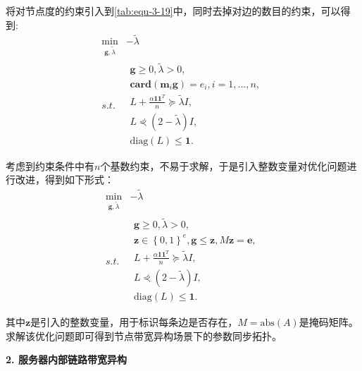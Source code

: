 将对节点度的约束引入到\autoref{tab:equ-3-19}中，同时去掉对边的数目的约束，可以得到:
\begin{equation}
    \label{tab:equ-3-24}
    \begin{matrix}
        \underset{\mathbf{g},\tilde{\lambda}}{\min}&		-\tilde{\lambda}\\
        s.t.&		\begin{array}{c}
        \mathbf{g}\ge 0,\tilde{\lambda}>0,\\
        \mathbf{card}\left( \boldsymbol{m}_i\mathbf{g} \right) =e_i, i=1,...,n,\\
        L+\frac{\alpha \mathbf{1}\mathbf{1}^T}{n}\succeq \tilde{\lambda} I,\\
        L\curlyeqprec \left( 2-\tilde{\lambda} \right)  I,\\
        \mathrm{diag}\left( L \right) \leqslant \mathbf{1}.\\
    \end{array}\\
    \end{matrix}
\end{equation}
考虑到约束条件中有$n$个基数约束，不易于求解，于是引入整数变量对优化问题进行改进，得到如下形式：
\begin{equation}
    \label{tab:equ-3-25}
    \begin{matrix}
        \underset{\mathbf{g},\tilde{\lambda}}{\min}&		-\tilde{\lambda}\\
        s.t.&		\begin{array}{c}
        \mathbf{g}\ge 0,\tilde{\lambda}>0,\\
        \mathbf{z}\in \left\{ 0,1 \right\} ^e,\mathbf{g}\leqslant \mathbf{z},M\mathbf{z}=\boldsymbol{e},\\
        L+\frac{\alpha \mathbf{1}\mathbf{1}^T}{n}\succeq \tilde{\lambda} I,\\
        L\curlyeqprec \left( 2-\tilde{\lambda} \right)  I,\\
        \mathrm{diag}\left( L \right) \leqslant \mathbf{1}.\\
    \end{array}\\
    \end{matrix}
\end{equation}
其中$\mathbf{z}$是引入的整数变量，用于标识每条边是否存在，$M=\mathrm{abs}\left( A\right)$是掩码矩阵。求解该优化问题即可得到节点带宽异构场景下的参数同步拓扑。

\textbf{2. 服务器内部链路带宽异构}

